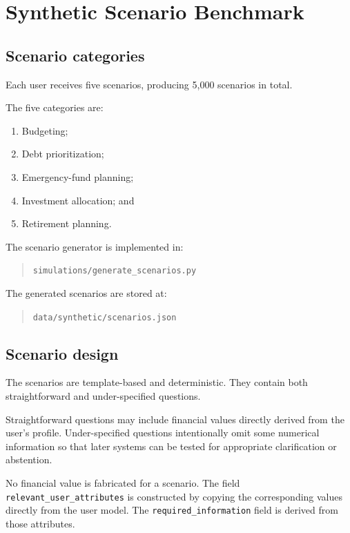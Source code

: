 \documentclass[12pt,a4paper]{article}
\begin{document}
\clearpage

\section{Synthetic Scenario Benchmark}

\subsection{Scenario categories}

Each user receives five scenarios, producing 5,000 scenarios in total.

The five categories are:
\begin{enumerate}
    \item Budgeting;
    \item Debt prioritization;
    \item Emergency-fund planning;
    \item Investment allocation; and
    \item Retirement planning.
\end{enumerate}

The scenario generator is implemented in:

\begin{quote}
\texttt{simulations/generate\_scenarios.py}
\end{quote}

The generated scenarios are stored at:

\begin{quote}
\texttt{data/synthetic/scenarios.json}
\end{quote}

\subsection{Scenario design}

The scenarios are template-based and deterministic. They contain both straightforward and under-specified questions.

Straightforward questions may include financial values directly derived from the user's profile. Under-specified questions intentionally omit some numerical information so that later systems can be tested for appropriate clarification or abstention.

No financial value is fabricated for a scenario. The field \texttt{relevant\_user\_attributes} is constructed by copying the corresponding values directly from the user model. The \texttt{required\_information} field is derived from those attributes.
\end{document}
